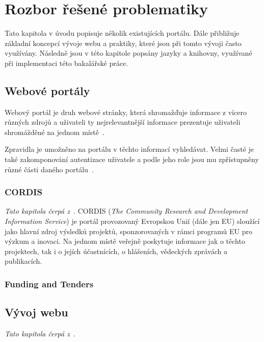 \chapter{Rozbor řešené problematiky}
Tato kapitola v úvodu popisuje několik existujících portálu. Dále přibližuje základní koncepcí vývoje webu a praktiky, které jsou při tomto vývoji často využívány. Následně jsou v této kapitole popsány jazyky a knihovny, využívané při implementaci této bakalářské práce.

\section{Webové portály}
Webový portál je druh webové stránky, která shromažďuje informace z vícero různých zdrojů a uživateli ty nejrelevantnější informace prezentuje uživateli shromážděné na jednom místě~\cite{bib:portal-liferay}.

Zpravidla je umožněno na portálu v těchto informací vyhledávat. Velmi časté je také zakomponování autentizace uživatele a podle jeho role jsou mu zpřístupněny různé části daného portálu~\cite{bib:portal-indiana}.

\blindtext[2]

\subsection{CORDIS}
\emph{Tato kapitola čerpá z~\cite{bib:cordis}}.
CORDIS (\emph{The Community Research and Development Information Service}) je portál provozovaný Evropskou Unií (dále jen EU) sloužící jako hlavní zdroj výsledků projektů, sponzorovaných v rámci programů EU pro výzkum a inovaci. Na jednom místě veřejně poskytuje informace jak o těchto projektech, tak i o jejích účastnících, o hlášeních, vědeckých zprávách a publikacích.
\blindtext

\subsection{Funding and Tenders}
\blindtext



\section{Vývoj webu}
\emph{Tato kapitola čerpá z~\cite{bib:web-development}}.

